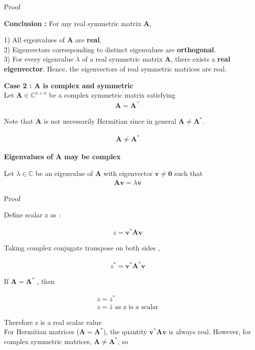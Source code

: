 \documentclass{beamer}
\numberwithin{equation}{section}
\theoremstyle{remark}
\let\vec\mathbf
\begin{document}
\begin{frame}{Proof}

\textbf{Conclusion :}
For any real symmetric matrix $\vec{A}$,

  1) All eigenvalues of $\vec{A}$ are \textbf{real}.\\
  2) Eigenvectors corresponding to distinct eigenvalues are \textbf{orthogonal}.\\
  3) For every eigenvalue $\lambda$ of a real symmetric matrix $\vec{A}$, there exists a \textbf{real eigenvector}.  
Hence, the eigenvectors of real symmetric matrices are real. 


\textbf{Case 2 : $\vec{A}$ is complex and symmetric}\\

Let $\vec{A} \in \mathbb{C}^{n \times n}$ be a complex symmetric matrix satisfying
\begin{align}
\vec{A} = \vec{A}^\top
\end{align}

Note that $\vec{A}$ is not necessarily Hermitian since in general $\vec{A} \ne \vec{A}^*$.

\begin{align}
\vec{A} \ne \vec{A}^*
\end{align}

\textbf{Eigenvalues of $\vec{A}$ may be complex}

Let $\lambda \in \mathbb{C}$ be an eigenvalue of $\vec{A}$ with eigenvector $\vec{v} \ne \vec{0}$ such that
\begin{align}
\vec{A}\vec{v} = \lambda \vec{v}
\end{align}

\end{frame}

\begin{frame}{Proof}

Define scalar z as :

\begin{align}
z = \vec{v}^* \vec{A} \vec{v}  
\end{align}

Taking complex conjugate transpose on both sides ,

\begin{align}
z^* = \vec{v}^* \vec{A}^* \vec{v}   
\end{align}

If $\vec{A} = \vec{A}^*$ , then 

\begin{align}
  z = z^* \\
  z = \bar{z} \text{   as z is a scalar}
\end{align}

Therefore z is a real scalar value \\

For Hermitian matrices ($\vec{A} = \vec{A}^*$), the quantity $\vec{v}^* \vec{A} \vec{v}$ is always real.  
However, for complex symmetric matrices, $\vec{A} \ne \vec{A}^*$, so

\end{frame}
\end{document}
